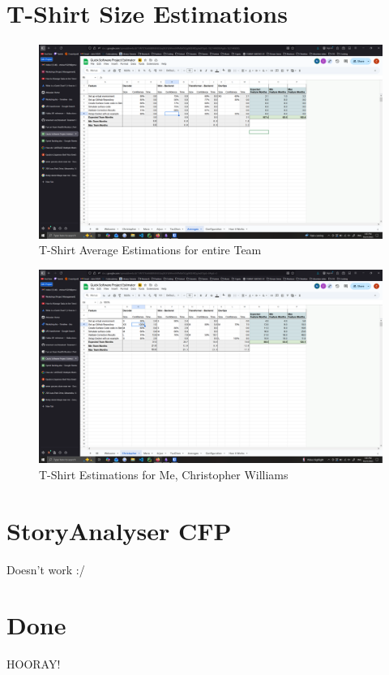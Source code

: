\documentclass[12pt]{article}
\begin{document}
\section{T-Shirt Size Estimations}

\begin{figure}[H]
    \centering
    \includegraphics[width=0.75\linewidth]{images/tshirt_sizes_q8.png}
    \caption{T-Shirt Average Estimations for entire Team}\label{fig:q8}
\end{figure}

\begin{figure}[H]
    \centering
    \includegraphics[width=0.75\linewidth]{images/tshirt_sizes_personal_q8.png}
    \caption{T-Shirt Estimations for Me, Christopher Williams}\label{fig:q82}
\end{figure}

\section{StoryAnalyser CFP}

Doesn't work :/

\section{Done}

\Huge{HOORAY!}
\end{document}
